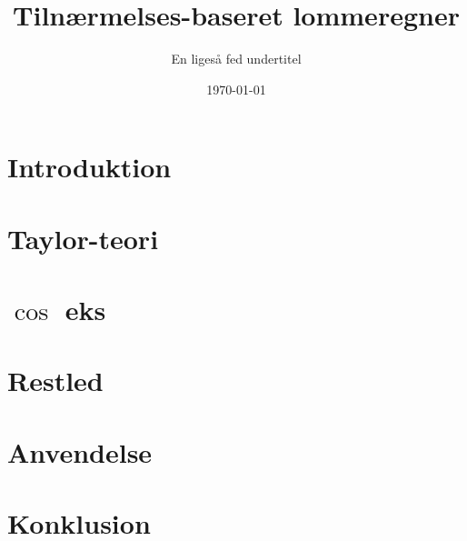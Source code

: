 \documentclass[10pt]{beamer}
\title{Tilnærmelses-baseret lommeregner}
\subtitle{En ligeså fed undertitel}
\date{\today}
\begin{document}
\frame{\titlepage}

\section{Introduktion}


\section{Taylor-teori}


\section{$\cos$ eks}


\section{Restled}


\section{Anvendelse}


\section{Konklusion}
\end{document}

